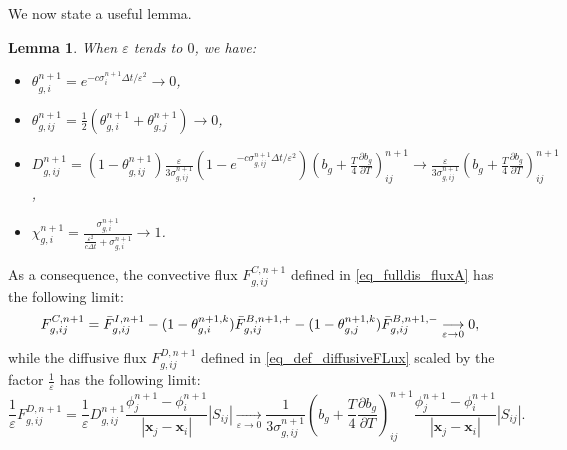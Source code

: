 \documentclass[preprint,12pt]{elsarticle}
\theoremstyle{definition}
\theoremstyle{plain}
\newtheorem{lemma}[theorem]{Lemma}
\numberwithin{equation}{section}
\numberwithin{algorithm}{section}
\newcounter{eq_count}
\newcommand{\half}{\frac{1}{2}}
\newcommand{\vr}{\mathbf{x}}
\newcommand{\pdrv}[2]{\frac{\partial{#1}}{\partial{#2}}}
\begin{document}
We now state a useful lemma.
\begin{lemma}
    When $\varepsilon$ tends to $0$, we have:
    \begin{itemize}
        \item $\theta^{n+1}_{g,i} = e^{-c \sigma_i^{n+1} \Delta t / \varepsilon^2} \longrightarrow 0$, 
        \item $\theta^{n+1}_{g,ij} =  \half(\theta_{g,i}^{n+1} + \theta_{g,j}^{n+1}   ) \longrightarrow 0$, 
        \item $ D_{g,ij}^{n+1} = ( 1 - \theta^{n+1}_{g,ij}  ) \frac{\varepsilon }{3\sigma^{n+1}_{g,ij}}(1-e^{-c \sigma_{g,ij}^{n+1}\Delta t/ \varepsilon^2}) (b_g + \frac{T}{4} \pdrv{b_g}{T})_{ij}^{n+1} \longrightarrow \frac{\varepsilon }{3\sigma_{g,ij}^{n+1}} (b_g + \frac{T}{4} \pdrv{b_g}{T})_{ij}^{n+1} $ , 
        \item $ \chi_{g,i}^{n+1}  = \frac{\sigma_{g,i}^{n+1} }{\frac{\varepsilon^2}{c \Delta t} + \sigma_{g,i}^{n+1} } \longrightarrow 1 $.
    \end{itemize}
\end{lemma}
As a consequence, the convective flux $F^{C,n+1}_{g,ij} $ defined in \eqref{eq_fulldis_fluxA} has the following limit:
\begin{equation*}
	F^{C,n+1}_{g,ij} = \Bar{F}_{g,ij}^{I,n+1} 
	- (1 - \theta_{g,i}^{n+1,k}) \Bar{F}_{g,ij}^{B,n+1,+}
	- (1 - \theta_{g,j}^{n+1,k}) \Bar{F}_{g,ij}^{B,n+1,-} \underset{\varepsilon \rightarrow 0}{\longrightarrow}  0,
\end{equation*}
while the diffusive flux $F_{g,ij}^{D,n+1}$ defined in \eqref{eq_def_diffusiveFLux} scaled by the factor $\frac{1}{\varepsilon}$  has the following limit: 
\begin{equation*}
	\frac{1}{\varepsilon} F_{g,ij}^{D,n+1} = \frac{1}{\varepsilon} D_{g,ij}^{n+1} \frac{\phi_{j}^{n+1} - \phi_i^{n+1}}{ |\vr_j - \vr_i| }|S_{ij}|  \underset{\varepsilon \rightarrow 0}{\longrightarrow} \frac{1 }{3\sigma_{g,ij}^{n+1}} (b_g + \frac{T}{4} \pdrv{b_g}{T})_{ij}^{n+1} \frac{\phi_{j}^{n+1} - \phi_i^{n+1}}{ |\vr_j - \vr_i| }|S_{ij}|.
\end{equation*}
\end{document}
